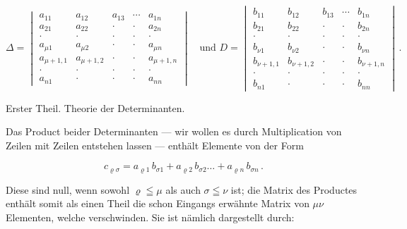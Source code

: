 \documentclass[11pt]{article}
\providecommand{\weberpage}[1]{}
\let\Delta\varDelta
\begin{document}
\[
\Delta =
\begin{vmatrix}
a_{11} & a_{12} & a_{13} & \cdots & a_{1n} \\
a_{21} & a_{22} & \cdot & \cdot & a_{2n} \\
\cdot & \cdot & \cdot & \cdot & \cdot \\
a_{\mu 1} & a_{\mu 2} & \cdot & \cdot & a_{\mu n} \\
a_{\mu+1,1} & a_{\mu+1,2} & \cdot & \cdot & a_{\mu+1,n} \\
\cdot & \cdot & \cdot & \cdot & \cdot \\
a_{n1} & \cdot & \cdot & \cdot & a_{nn}
\end{vmatrix}
\quad\text{und } D=
\begin{vmatrix}
b_{11} & b_{12} & b_{13} & \cdots & b_{1n} \\
b_{21} & b_{22} & \cdot & \cdot & b_{2n} \\
\cdot & \cdot & \cdot & \cdot & \cdot \\
b_{\nu 1} & b_{\nu 2} & \cdot & \cdot & b_{\nu n} \\
b_{\nu+1,1} & b_{\nu+1,2} & \cdot & \cdot & b_{\nu+1,n} \\
\cdot & \cdot & \cdot & \cdot & \cdot \\
b_{n1} & \cdot & \cdot & \cdot & b_{nn}
\end{vmatrix}\, .
\]


\weberpage{96}
Erster Theil. Theorie der Determinanten.

Das Product beider Determinanten — wir wollen es durch Multiplication von Zeilen mit Zeilen entstehen lassen — enthält Elemente von der Form

\[
c_{\varrho\sigma} = a_{\varrho 1}\, b_{\sigma 1} + a_{\varrho 2}\, b_{\sigma 2} \ldots + a_{\varrho n}\, b_{\sigma n}\, .
\]

Diese sind null, wenn sowohl $\varrho\leqq\mu$ als auch $\sigma\leqq\nu$ ist; die Matrix des Productes enthält somit als einen Theil die schon Eingangs erwähnte Matrix von $\mu\nu$ Elementen, welche verschwinden. Sie ist nämlich dargestellt durch:
\end{document}
